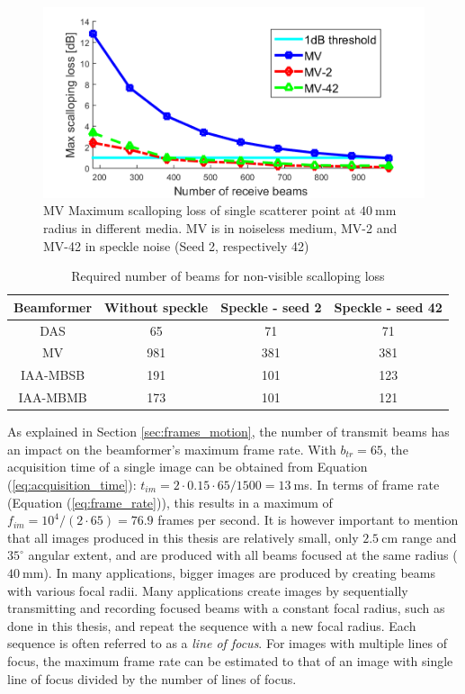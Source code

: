 \begin{figure}[ht]
    \centering
        \includegraphics[width=\linewidth]{./images/results/1/loss_vs_beams_ext.png}
	\caption{MV Maximum scalloping loss of single scatterer point at $40~$mm radius in different media. MV is in noiseless medium, MV-2 and MV-42 in speckle noise (Seed 2, respectively 42)}
	\label{fig:loss_vs_beams_ext}
\end{figure}

\begin{table}[!ht]
\centering
\begin{tabular}{| c | c | c | c |}
  \hline
  Beamformer &   Without speckle   &   Speckle - seed 2 &   Speckle - seed 42 \\
  \hline
  DAS       &   65      &   71  &   71   \\
  MV        &   981     &   381  &   381 \\
  IAA-MBSB  &   191     &   101  &   123  \\
  IAA-MBMB  &   173     &   101 &   121  \\
  \hline
 \end{tabular}
\caption{Required number of beams for non-visible scalloping loss}
\label{table:num_beams}
\end{table}

As explained in Section \ref{sec:frames_motion}, the number of transmit beams has an impact on the beamformer's maximum frame rate. With $b_{tr} = 65$, the acquisition time of a single image can be obtained from Equation (\ref{eq:acquisition_time}): $t_{im} = 2 \cdot 0.15 \cdot 65 / 1500 = 13~$ms. In terms of frame rate (Equation (\ref{eq:frame_rate})), this results in a maximum of $f_{im} = 10^4 / (2 \cdot 65) = 76.9$ frames per second.
It is however important to mention that all images produced in this thesis are relatively small, only $2.5~$cm range and $35^\circ$ angular extent, and are produced with all beams focused at the same radius ($40~$mm). In many applications, bigger images are produced by creating beams with various focal radii. Many applications create images by sequentially transmitting and recording focused beams with a constant focal radius, such as done in this thesis, and repeat the sequence with a new focal radius. Each sequence is often referred to as a \textit{line of focus}. For images with multiple lines of focus, the maximum frame rate can be estimated to that of an image with single line of focus divided by the number of lines of focus.


